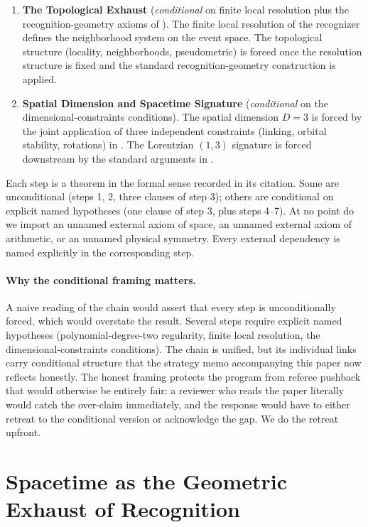 \documentclass[11pt,a4paper]{article}
\theoremstyle{definition}
\theoremstyle{remark}
\begin{document}
\begin{enumerate}
\item \textbf{The Topological Exhaust} (\emph{conditional} on
finite local resolution plus the recognition-geometry axioms of
\cite{WashburnZlatanovicAllahyarov2026Axioms}). The finite local
resolution of the recognizer defines the neighborhood system on the
event space. The topological structure (locality, neighborhoods,
pseudometric) is forced once the resolution structure is fixed and
the standard recognition-geometry construction is applied.

\item \textbf{Spatial Dimension and Spacetime Signature}
(\emph{conditional} on the dimensional-constraints conditions). The
spatial dimension $D = 3$ is forced by the joint application of
three independent constraints (linking, orbital stability, rotations)
in \cite{PardoGuerraThapaWashburnAllahyarov2026}. The Lorentzian
$(1, 3)$ signature is forced downstream by the standard arguments
in \cite{Washburn2026RealityFromOneDistinction}.
\end{enumerate}

Each step is a theorem in the formal sense recorded in its citation.
Some are unconditional (steps 1, 2, three clauses of step 3); others
are conditional on explicit named hypotheses (one clause of step 3,
plus steps 4--7). At no point do we import an unnamed external
axiom of space, an unnamed external axiom of arithmetic, or an
unnamed physical symmetry. Every external dependency is named
explicitly in the corresponding step.

\paragraph{Why the conditional framing matters.} A naive reading of
the chain would assert that every step is unconditionally forced,
which would overstate the result. Several steps require explicit
named hypotheses (polynomial-degree-two regularity, finite local
resolution, the dimensional-constraints conditions). The chain is
unified, but its individual links carry conditional structure that
the strategy memo accompanying this paper now reflects honestly.
The honest framing protects the program from referee pushback that
would otherwise be entirely fair: a reviewer who reads the paper
literally would catch the over-claim immediately, and the response
would have to either retreat to the conditional version or
acknowledge the gap. We do the retreat upfront.

\section{Spacetime as the Geometric Exhaust of Recognition}
\label{sec:spacetime}
\end{document}
